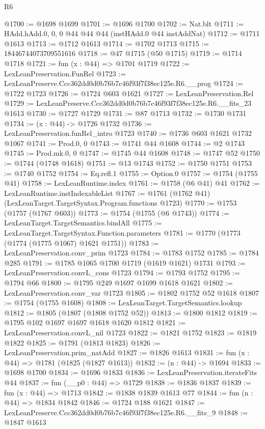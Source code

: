 \begin{lexlean}{R6}
\begin{coremodule}
@1700 := @1698 @1699
@1701 := @1696 @1700
@1702 := Nat.blt
@1711 := HAdd.hAdd.{0, 0, 0} @44 @44 @44 (instHAdd.{0} @44 instAddNat)
@1712 := @1711 @1613
@1713 := @1712 @1613
@1714 := @1702 @1713
@1715 := 18446744073709551616
@1718 := @47 @1715 (@50 @1715)
@1719 := @1714 @1718
@1721 := fun (x : @44) => @1701 @1719
@1722 := LexLeanPreservation.FunRel
@1723 := LexLeanPreserve.Ccc362dd0d0b76b7c46f93f7f38ec125e.R6.__prog
@1724 := @1722 @1723
@1726 := @1724 @603 @1621
@1727 := LexLeanPreservation.Rel
@1729 := LexLeanPreserve.Ccc362dd0d0b76b7c46f93f7f38ec125e.R6.__fits_23 @1613
@1730 := @1727 @1729
@1731 := @87 @1713
@1732 := @1730 @1731
@1734 := (x : @44) -> @1726 @1732
@1736 := LexLeanPreservation.funRel_intro @1723
@1740 := @1736 @603 @1621 @1732 @1067
@1741 := Prod.{0, 0}
@1743 := @1741 @44 @1608
@1744 := @2 @1743
@1745 := Prod.mk.{0, 0}
@1747 := @1745 @44 @1608
@1748 := @1747 @52
@1750 := @1744 (@1748 @1618)
@1751 := @13 @1743
@1752 := @1750 @1751
@1753 := @1740 @1752
@1754 := Eq.refl.{1}
@1755 := Option.{0}
@1757 := @1754 (@1755 @41)
@1758 := LexLeanRuntime.index
@1761 := @1758 (@6 @41) @41
@1762 := LexLeanRuntime.instIndexableList
@1767 := @1761 (@1762 @41) (LexLeanTarget.TargetSyntax.Program.functions @1723)
@1770 := @1753 (@1757 (@1767 @603))
@1773 := @1754 (@1755 (@6 @1743))
@1774 := LexLeanTarget.TargetSemantics.bindAll
@1775 := LexLeanTarget.TargetSyntax.Function.parameters
@1781 := @1770 (@1773 (@1774 (@1775 @1067) @1621 @1751))
@1783 := LexLeanPreservation.conv_prim @1723
@1784 := @1783 @1752
@1785 := @1784 @285
@1791 := @1785 @1065 @1700 @1719 (@1619 @1621) @1731
@1793 := LexLeanPreservation.convL_cons @1723
@1794 := @1793 @1752
@1795 := @1794 @66
@1800 := @1795 @249 @1697 @1699 @1618 @1621
@1802 := LexLeanPreservation.conv_var @1723
@1805 := @1802 @1752 @52 @1618
@1807 := @1754 (@1755 @1608)
@1808 := LexLeanTarget.TargetSemantics.lookup
@1812 := @1805 (@1807 (@1808 @1752 @52))
@1813 := @1800 @1812
@1819 := @1795 @102 @1697 @1697 @1618 @1620 @1812
@1821 := LexLeanPreservation.convL_nil @1723
@1822 := @1821 @1752
@1823 := @1819 @1822
@1825 := @1791 (@1813 @1823)
@1826 := LexLeanPreservation.prim_natAdd
@1827 := @1826 @1613
@1831 := fun (x : @44) => @1781 (@1825 (@1827 @1613))
@1832 := (n : @44) -> @1694
@1833 := @1698 @1700
@1834 := @1696 @1833
@1836 := LexLeanPreservation.iterateFits @44
@1837 := fun (__p0 : @44) => @1729
@1838 := @1836 @1837
@1839 := fun (x : @44) => @1713
@1842 := @1838 @1839 @1613 @77
@1844 := fun (n : @44) => @1834 @1842
@1846 := @1724 @188 @1621
@1847 := LexLeanPreserve.Ccc362dd0d0b76b7c46f93f7f38ec125e.R6.__fits_9
@1848 := @1847 @1613

\end{coremodule}
\end{lexlean}
